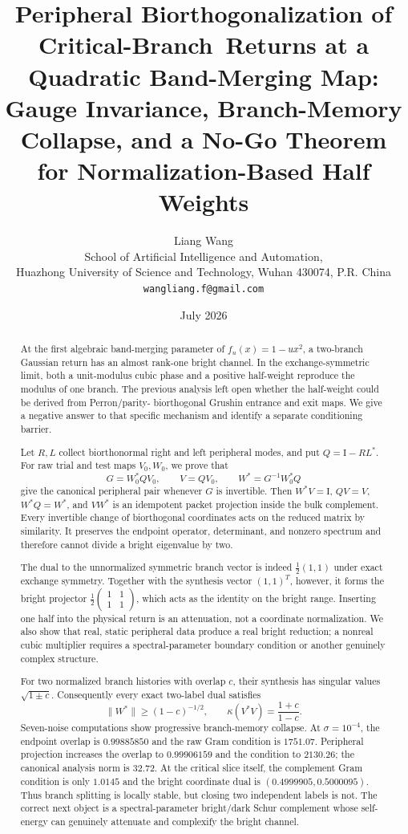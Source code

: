 \documentclass[11pt]{article}
\title{\textbf{Peripheral Biorthogonalization of Critical-Branch}\
\textbf{Returns at a Quadratic Band-Merging Map:}\\[0.35em]
\large Gauge Invariance, Branch-Memory Collapse, and a No-Go Theorem\\
for Normalization-Based Half Weights}
\author{Liang Wang\\
\small School of Artificial Intelligence and Automation,\\[-0.2em]
\small Huazhong University of Science and Technology, Wuhan 430074, P.R. China\\
\small \texttt{wangliang.f@gmail.com}}
\date{July 2026}
\theoremstyle{definition}
\theoremstyle{remark}
\newcommand{\Id}{\mathrm I}
\begin{document}
\maketitle

\begin{abstract}
At the first algebraic band-merging parameter of $f_u(x)=1-u x^2$, a
two-branch Gaussian return has an almost rank-one bright channel.  In the
exchange-symmetric limit, both a unit-modulus cubic phase and a positive
half-weight reproduce the modulus of one branch.  The previous analysis
left open whether the half-weight could be derived from Perron/parity-
biorthogonal Grushin entrance and exit maps.  We give a negative answer to
that specific mechanism and identify a separate conditioning barrier.

Let $R,L$ collect biorthonormal right and left peripheral modes, and put
$Q=\Id-RL^*$.  For raw trial and test maps $V_0,W_0$, we prove that
\[
 G=W_0^*QV_0,
 \qquad V=QV_0,
 \qquad W^*=G^{-1}W_0^*Q
\]
give the canonical peripheral pair whenever $G$ is invertible.  Then
$W^*V=\Id$, $QV=V$, $W^*Q=W^*$, and $VW^*$ is an idempotent packet
projection inside the bulk complement.  Every invertible change of
biorthogonal coordinates acts on the reduced matrix by similarity.  It
preserves the endpoint operator, determinant, and nonzero spectrum and
therefore cannot divide a bright eigenvalue by two.

The dual to the unnormalized symmetric branch vector is indeed
$\frac12(1,1)$ under exact exchange symmetry.  Together with the synthesis
vector $(1,1)^T$, however, it forms the bright projector
$\frac12\left(\begin{smallmatrix}1&1\\1&1\end{smallmatrix}\right)$, which
acts as the identity on the bright range.  Inserting one half into the
physical return is an attenuation, not a coordinate normalization.  We also
show that real, static peripheral data produce a real bright reduction; a
nonreal cubic multiplier requires a spectral-parameter boundary condition
or another genuinely complex structure.

For two normalized branch histories with overlap $c$, their synthesis has
singular values $\sqrt{1\pm c}$.  Consequently every exact two-label dual
satisfies
\[
 \|W^*\|\ge(1-c)^{-1/2},
 \qquad
 \kappa(V^*V)=\frac{1+c}{1-c}.
\]
Seven-noise computations show progressive branch-memory collapse.  At
$\sigma=10^{-4}$, the endpoint overlap is $0.99885850$ and the raw Gram
condition is $1751.07$.  Peripheral projection increases the overlap to
$0.99906159$ and the condition to $2130.26$; the canonical analysis norm is
$32.72$.  At the critical slice itself, the complement Gram condition is
only $1.0145$ and the bright coordinate dual is
$(0.4999905,0.5000095)$.  Thus branch splitting is locally stable, but
closing two independent labels is not.  The correct next object is a
spectral-parameter bright/dark Schur complement whose self-energy can
genuinely attenuate and complexify the bright channel.
\end{abstract}
\end{document}
